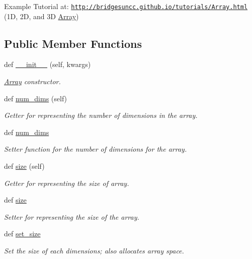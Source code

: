 Example Tutorial at\+: \href{http://bridgesuncc.github.io/tutorials/Array.html}{\tt http\+://bridgesuncc.\+github.\+io/tutorials/\+Array.\+html} (1D, 2D, and 3D \hyperlink{classbridges_1_1array_1_1_array}{Array}) \subsection*{Public Member Functions}
\begin{DoxyCompactItemize}
\item 
def \hyperlink{classbridges_1_1array_1_1_array_ac772cbf7ad482b235e30929c8e1063a4}{\+\_\+\+\_\+init\+\_\+\+\_\+} (self, kwargs)
\begin{DoxyCompactList}\small\item\em \hyperlink{classbridges_1_1array_1_1_array}{Array} constructor. \end{DoxyCompactList}\item 
def \hyperlink{classbridges_1_1array_1_1_array_aaef2013f0e3befd61c0497638f409bc8}{num\+\_\+dims} (self)
\begin{DoxyCompactList}\small\item\em Getter for representing the number of dimensions in the array. \end{DoxyCompactList}\item 
def \hyperlink{classbridges_1_1array_1_1_array_ab7374f0d4bb0a9514b4af29bdd8935a5}{num\+\_\+dims}
\begin{DoxyCompactList}\small\item\em Setter function for the number of dimensions for the array. \end{DoxyCompactList}\item 
def \hyperlink{classbridges_1_1array_1_1_array_a01292e2099a89d0927855c25aedc8662}{size} (self)
\begin{DoxyCompactList}\small\item\em Getter for representing the size of array. \end{DoxyCompactList}\item 
def \hyperlink{classbridges_1_1array_1_1_array_a28cc9cbafb4e0d0fbfe22c12d1717351}{size}
\begin{DoxyCompactList}\small\item\em Setter for representing the size of the array. \end{DoxyCompactList}\item 
def \hyperlink{classbridges_1_1array_1_1_array_a0f1ede3d78cfafe1202d28520096272e}{set\+\_\+size}
\begin{DoxyCompactList}\small\item\em Set the size of each dimensions; also allocates array space. \end{DoxyCompactList}\item 

\end{DoxyCompactItemize}
